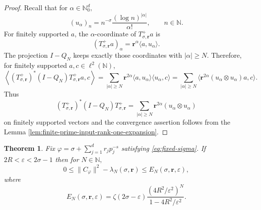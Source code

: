 \documentclass[12pt, reqno]{amsart}
\numberwithin{equation}{section}
\newtheorem{theorem}{Theorem}[section]
\begin{document}
\begin{proof}
Recall that for $\alpha\in\mathbb{N}_{0}^{d},$
\[
(u_{\alpha})_n
=
n^{-\sigma}
\frac{(\log n)^{|\alpha|}}{\alpha!},
\qquad
n\in\mathbb{N}.
\]
For finitely supported \(a\), the \(\alpha\)-coordinate of
$T_{\sigma,\boldsymbol{r}}^{+}a$ is
\[
(T_{\sigma,\boldsymbol{r}}^{+}a)_{\alpha}
=
\boldsymbol{r}^{\alpha}\langle a,u_{\alpha}\rangle.
\]
The projection $I-Q_N$ keeps exactly those coordinates with
$|\alpha|\geq N.$
Therefore, for finitely supported \(a,c\in\ell^{2}(\mathbb{N})\),
\[
\left\langle
(T_{\sigma,\boldsymbol{r}}^{+})^{*}(I-Q_N)T_{\sigma,\boldsymbol{r}}^{+}a,c
\right\rangle
=
\sum_{|\alpha|\geq N}
\boldsymbol{r}^{2\alpha}
\langle a,u_{\alpha}\rangle
\langle u_{\alpha},c\rangle= \sum_{|\alpha|\geq N}
\langle \boldsymbol{r}^{2\alpha}(u_\alpha\otimes u_\alpha)a,c \rangle.
\]
Thus
\[
(T_{\sigma,\boldsymbol{r}}^{+})^{*}(I-Q_N)T_{\sigma,\boldsymbol{r}}^{+}
=
\sum_{|\alpha|\geq N}
\boldsymbol{r}^{2\alpha}(u_{\alpha}\otimes u_{\alpha})
\]
on finitely supported vectors and the convergence assertion follows from the Lemma \ref{lem:finite-prime-input-rank-one-expansion}.
\end{proof}

\begin{theorem}
\label{thm:finite-section}
Fix $\varphi=\sigma+\sum_{j=1}^{d}r_jp_j^{-s}$ satisfying  \eqref{eq:fixed-sigma}.
If $2R<\varepsilon<2\sigma-1$ then for $N\in\mathbb{N},$
\[
0\leq
\|C_{\varphi}\|^{2}
-
\lambda_N(\sigma,\boldsymbol{r})
\leq
E_N(\sigma,\boldsymbol{r},\varepsilon),
\]
where
\[
E_N(\sigma,\boldsymbol{r},\varepsilon)
=
\zeta(2\sigma-\varepsilon)
\frac{(4R^{2}/\varepsilon^{2})^{N}}{1-4R^{2}/\varepsilon^{2}}.
\]
\end{theorem}
\end{document}
